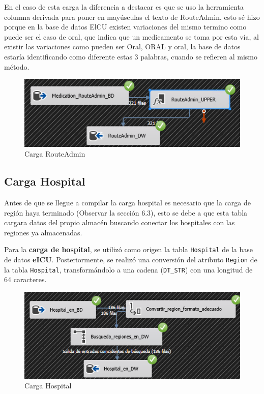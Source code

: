 \documentclass[12pt, a4paper, twoside]{article}
\begin{document}
	En el caso de esta carga la diferencia a destacar es que se uso la herramienta columna derivada para poner en mayúsculas el texto de RouteAdmin, esto sé hizo porque en la base de datos ElCU existen variaciones del mismo termino como puede ser el caso de oral, que indica que un medicamento se toma por esta vía, al existir las variaciones como pueden ser Oral, ORAL y oral, la base de datos estaría identificando como diferente estas 3 palabras, cuando se refieren al mismo método.
	
	\begin{figure}[H]
		\centering
		\includegraphics[width=1\textwidth]{image/117_RouteAdmin.png}
		\caption{Carga RouteAdmin}
		\label{fig:32}
	\end{figure}
	
	
	\subsection{Carga Hospital}
	
	
	Antes de que se llegue a compilar la carga hospital es necesario que la carga de región haya terminado (Observar la sección 6.3), esto se debe a que esta tabla cargara datos del propio almacén buscando conectar los hospitales con las regiones ya almacenadas.
	
	Para la \textbf{carga de hospital}, se utilizó como origen la tabla \texttt{Hospital} de la base de datos \textbf{eICU}. Posteriormente, se realizó una conversión del atributo \texttt{Region} de la tabla \texttt{Hospital}, transformándolo a una cadena (\texttt{DT\_STR}) con una longitud de 64 caracteres. 
	
	\begin{figure}[H]
		\centering
		\includegraphics[width=1\textwidth]{image/105_cargahospital.png}
		\caption{Carga Hospital}
		\label{fig:16}
	\end{figure}
	
\end{document}

